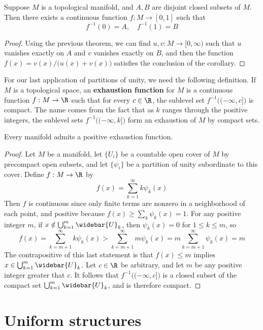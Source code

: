 \begin{corollary}
Suppose $M$ is a topological manifold, and $A,B$ are disjoint closed subsets of $M$. Then there exists a continuous function $f:M\to [0,1]$ such that 
\[f^{-1}(0)=A,\quad f^{-1}(1)=B\]
\end{corollary}
\begin{proof}
Using the previous theorem, we can find $u,v: M\to [0,\infty)$ such that $u$ vanishes exactly on $A$ and $v$ vanishes exactly on $B$, and then the function $f(x)=v(x)/\big(u(x)+v(x)\big)$ satisfies the conclusion of the corollary.
\end{proof}
For our last application of partitions of unity, we need the following definition. If $M$ is a topological space, an \textbf{exhaustion function} for $M$ is a continuous function $f:M\to \R$ such that for every $c\in\R$, the sublevel set $f^{-1}\big((-\infty,c]\big)$ is compact. The name comes from the fact that as $k$ ranges through the positive integers, the sublevel sets $f^{-1}\big((-\infty,k]\big)$ form an exhaustion of $M$ by compact sets.
\begin{theorem}\label{exhaustion functions}
Every manifold admits a positive exhaustion function.
\end{theorem}
\begin{proof}
Let $M$ be a manifold, let $\{U_i\}$ be a countable open cover of $M$ by precompact open subsets, and let $\{\psi_i\}$ be a partition of unity subordinate to this cover. Define $f:M\to\R$ by
\[f(x)=\sum_{k=1}^{\infty}k\psi_k(x)\]
Then $f$ is continuous since only finite terms are nonzero in a neighborhood of each point, and positive because $f(x)\geq\sum_{k}\psi_k(x)=1$. For any positive integer $m$, if $x\notin\bigcup_{k=1}^{m}\widebar{U}_k$, then $\psi_k(x)=0$ for $1\leq k\leq m$, so
\[f(x)=\sum_{k=m+1}^{\infty}k\psi_k(x)>\sum_{k=m+1}^{\infty}m\psi_k(x)=m\sum_{k=m+1}^{\infty}\psi_k(x)=m\]
The contrapositive of this last statement is that $f(x)\leq m$ implies $x\in\bigcup_{k=1}^{m}\widebar{U}_k$. Let $c\in\R$ be arbitrary, and let $m$ be any positive integer greater that $c$. It follows that $f^{-1}\big((-\infty,c]\big)$ is a closed subset of the compact set $\bigcup_{k=1}^{m}\widebar{U}_k$, and is therefore compact.
\end{proof}
\chapter{Uniform structures}
